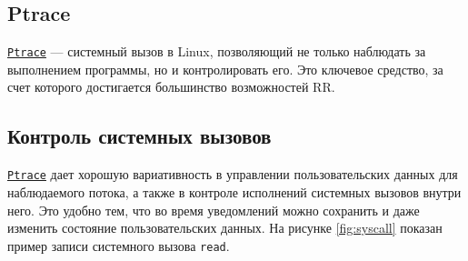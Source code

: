 
\subsection{Ptrace}

\href{https://man7.org/linux/man-pages/man2/ptrace.2.html}{\texttt{Ptrace}} — системный вызов в Linux, позволяющий не только наблюдать за выполнением программы, 
но и контролировать его. Это ключевое средство, за счет которого 
достигается большинство возможностей RR.

\subsection{Контроль системных вызовов}

\href{https://man7.org/linux/man-pages/man2/ptrace.2.html}{\texttt{Ptrace}} дает хорошую вариативность в 
управлении пользовательских данных для наблюдаемого потока, 
а также в контроле исполнений системных вызовов внутри него. 
Это удобно тем, что во время уведомлений можно сохранить и даже изменить состояние пользовательских данных. 
На рисунке \ref{fig:syscall} показан пример записи системного вызова \texttt{read}.

